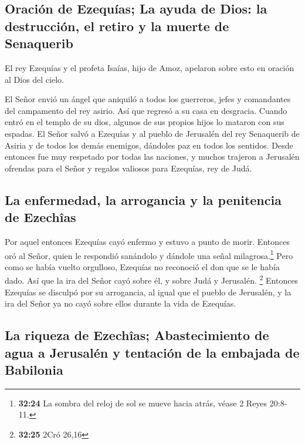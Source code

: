 \hypertarget{oraciuxf3n-de-ezequuxedas-la-ayuda-de-dios-la-destrucciuxf3n-el-retiro-y-la-muerte-de-senaquerib}{%
\subsection{Oración de Ezequías; La ayuda de Dios: la destrucción, el
retiro y la muerte de
Senaquerib}\label{oraciuxf3n-de-ezequuxedas-la-ayuda-de-dios-la-destrucciuxf3n-el-retiro-y-la-muerte-de-senaquerib}}

 El rey Ezequías y el profeta Isaías, hijo de Amoz,
apelaron sobre esto en oración al Dios del cielo.

 El Señor envió un ángel que aniquiló a todos los
guerreros, jefes y comandantes del campamento del rey asirio. Así que
regresó a su casa en desgracia. Cuando entró en el templo de su dios,
algunos de sus propios hijos lo mataron con sus espadas. 
El Señor salvó a Ezequías y al pueblo de Jerusalén del rey Senaquerib de
Asiria y de todos los demás enemigos, dándoles paz en todos los
sentidos.  Desde entonces fue muy respetado por todas las
naciones, y muchos trajeron a Jerusalén ofrendas para el Señor y regalos
valiosos para Ezequías, rey de Judá.

\hypertarget{la-enfermedad-la-arrogancia-y-la-penitencia-de-ezechuxeeas}{%
\subsection{La enfermedad, la arrogancia y la penitencia de
Ezechîas}\label{la-enfermedad-la-arrogancia-y-la-penitencia-de-ezechuxeeas}}

 Por aquel entonces Ezequías cayó enfermo y estuvo a
punto de morir. Entonces oró al Señor, quien le respondió sanándolo y
dándole una señal milagrosa.\footnote{\textbf{32:24} La sombra del reloj
  de sol se mueve hacia atrás, véase 2 Reyes 20:8-11.} 
Pero como se había vuelto orgulloso, Ezequías no reconoció el don que se
le había dado. Así que la ira del Señor cayó sobre él, y sobre Judá y
Jerusalén. \footnote{\textbf{32:25} 2Cró 26,16}  Entonces
Ezequías se disculpó por su arrogancia, al igual que el pueblo de
Jerusalén, y la ira del Señor ya no cayó sobre ellos durante la vida de
Ezequías.

\hypertarget{la-riqueza-de-ezechuxeeas-abastecimiento-de-agua-a-jerusaluxe9n-y-tentaciuxf3n-de-la-embajada-de-babilonia}{%
\subsection{La riqueza de Ezechîas; Abastecimiento de agua a Jerusalén y
tentación de la embajada de
Babilonia}\label{la-riqueza-de-ezechuxeeas-abastecimiento-de-agua-a-jerusaluxe9n-y-tentaciuxf3n-de-la-embajada-de-babilonia}}

